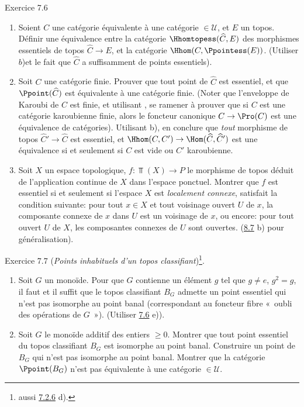 \documentclass[10pt]{../fichiers-configuration-latex/smfart}
\begin{document}
\begin{enonce*}[remark]{Exercice 7.6}
\begin{enumerate}
\item Soient $C$ une catégorie équivalente à une catégorie $\in
𝒰$, et $E$ un topos. Définir une équivalence entre la
catégorie $\Hhomtopess(\widehat{C},E)$ des morphismes essentiels de
topos $\widehat{C}\rightarrow E$, et la catégorie $\Hhom(C,
\Ppointess(E))$. (Utiliser $b$)\pageoriginale et le fait que
$\widehat{C}$ a suffisamment de points essentiels).

\item Soit $C$ une catégorie finie. Prouver que tout point de
$\widehat{C}$ est essentiel, et que $\Ppoint(\widehat{C})$ est
équivalente à une catégorie finie. (Noter que l'enveloppe de Karoubi
de $C$ est finie, et utilisant , se ramener à prouver
que si $C$ est une catégorie karoubienne finie, alors le foncteur
canonique $C\rightarrow \Pro(C)$ est une équivalence de catégories).
Utilisant b), en conclure que \emph{tout} morphisme de topos
$\widehat{C}'\rightarrow \widehat{C}$ est essentiel, et
$\Hhom(C,C')\rightarrow \Hom(\widehat{C},\widehat{C}')$ est une
équivalence si et seulement si $C$ est vide ou $C'$ karoubienne.

\item Soit $X$ un espace topologique, $f:\Top(X)\rightarrow P$ le
morphisme de topos déduit de l'application continue de $X$ dans
l'espace ponctuel. Montrer que $f$ est essentiel si et seulement si
l'espace $X$ est \emph{localement connexe}, \ie satisfait la
condition suivante: pour tout $x\in X$ et tout voisinage ouvert $U$
de $x$, la composante connexe de $x$ dans $U$ est un voisinage de
$x$, ou encore: pour tout ouvert $U$ de $X$, les composantes
connexes de $U$ sont ouvertes. (\cf \hyperref[IV.exer8.7]{8.7} b) pour
généralisation).
\end{enumerate}
\end{enonce*}

\begin{enonce*}[remark]{Exercice 7.7}
(\emph{Points inhabituels d'un topos classifiant})\footnote[1]{\cf
aussi \hyperref[IV.exer7.2.6]{7.2.6} d).}.
\begin{enumerate}
\renewcommand{\theenumi}{\alph{enumi}}
\renewcommand{\labelenumi}{\theenumi)}
\item Soit $G$ un monoïde. Pour que $G$ contienne un élément $g$ tel
que $g\neq e$, $g^2=g$, il faut et il suffit que le topos
classifiant $B_G$ admette un point essentiel qui n'est pas isomorphe
au point banal (correspondant au foncteur fibre « oubli des
opérations de $G$ »). (Utiliser \hyperref[IV.exer7.6]{7.6} e)).

\item Soit $G$ le monoïde additif des entiers $\geq 0$. Montrer que
tout point essentiel du topos classifiant $B_G$ est isomorphe au
point banal. Construire un point de $B_G$ qui n'est pas isomorphe au
point banal. Montrer que la catégorie $\Ppoint(B_G)$ n'est pas
équivalente à une catégorie $\in 𝒰$.
\end{enumerate}
\end{enonce*}
\end{document}
